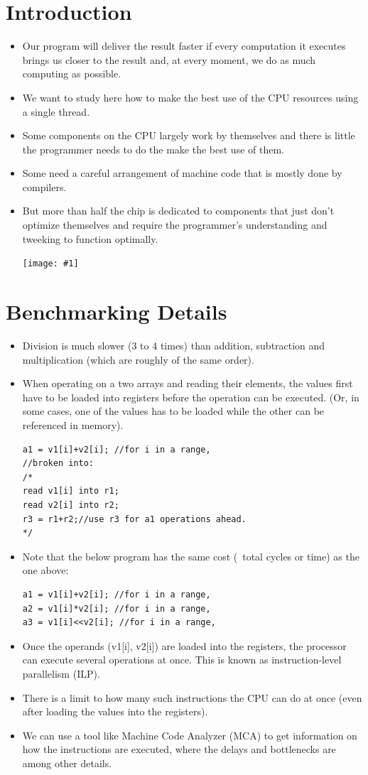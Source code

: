 \documentclass{report}
\newcommand{\mygraphic}[1]{
\begin{center}
    \texttt{[image: \#1]}
\end{center}
}
\begin{document}
\section{Introduction}
\begin{itemize}
\item Our program will deliver the result faster if every computation it executes brings us closer to the result and, at every moment, we do as much computing as possible.
\item We want to study here how to make the best use of the CPU resources using a single thread.
\item Some components on the CPU largely work by themselves and there is little the programmer needs to do the make the best use of them.
\item Some need a careful arrangement of machine code that is mostly done by compilers.
\item But more than half the chip is dedicated to components that just don't optimize themselves and require the programmer's understanding and tweeking to function optimally.
\mygraphic{rsrc/silicon.png}
\end{itemize}
\section{Benchmarking Details}
\begin{itemize}
\item Division is much slower (3 to 4 times) than addition, subtraction and multiplication (which are roughly of the same order).
\item When operating on a two arrays and reading their elements, the values first have to be loaded into registers before the operation can be executed. (Or, in some cases, one of the values has to be loaded while the other can be referenced in memory).
\begin{lstlisting}
a1 = v1[i]+v2[i]; //for i in a range,
//broken into:
/*
read v1[i] into r1;
read v2[i] into r2;
r3 = r1+r2;//use r3 for a1 operations ahead.
*/
\end{lstlisting}
\item Note that the below program has the same cost (~total cycles or time) as the one above:
\begin{lstlisting}
a1 = v1[i]+v2[i]; //for i in a range,
a2 = v1[i]*v2[i]; //for i in a range,
a3 = v1[i]<<v2[i]; //for i in a range,
\end{lstlisting}
\item Once the operands (v1[i], v2[i]) are loaded into the registers, the processor can execute several operations at once. This is known as instruction-level parallelism (ILP).
\item There is a limit to how many such instructions the CPU can do at once (even after loading the values into the registers).
\item We can use a tool like Machine Code Analyzer (MCA) to get information on how the instructions are executed, where the delays and bottlenecks are among other details.
\end{itemize}
\end{document}
